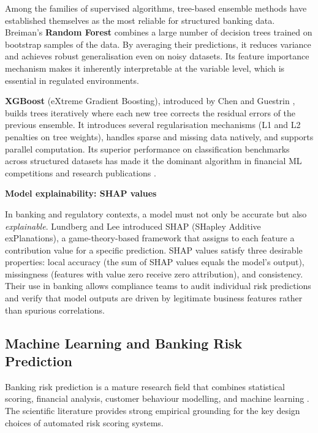 Among the families of supervised algorithms, tree-based ensemble methods have established
themselves as the most reliable for structured banking data. Breiman's \textbf{Random
Forest} \cite{breiman2001} combines a large number of decision trees trained on bootstrap
samples of the data. By averaging their predictions, it reduces variance and achieves robust
generalisation even on noisy datasets. Its feature importance mechanism makes it inherently
interpretable at the variable level, which is essential in regulated environments.

\textbf{XGBoost} (eXtreme Gradient Boosting), introduced by Chen and Guestrin
\cite{chen2016}, builds trees iteratively where each new tree corrects the residual errors
of the previous ensemble. It introduces several regularisation mechanisms (L1 and L2
penalties on tree weights), handles sparse and missing data natively, and supports parallel
computation. Its superior performance on classification benchmarks across structured datasets
has made it the dominant algorithm in financial ML competitions and research publications
\cite{lessmann2015}.

\textbf{Model explainability: SHAP values}

In banking and regulatory contexts, a model must not only be accurate but also
\textit{explainable}. Lundberg and Lee \cite{lundberg2017} introduced SHAP (SHapley
Additive exPlanations), a game-theory-based framework that assigns to each feature a
contribution value for a specific prediction. SHAP values satisfy three desirable
properties: local accuracy (the sum of SHAP values equals the model's output),
missingness (features with value zero receive zero attribution), and consistency.
Their use in banking allows compliance teams to audit individual risk predictions and
verify that model outputs are driven by legitimate business features rather than
spurious correlations.

\subsection{Machine Learning and Banking Risk Prediction}

Banking risk prediction is a mature research field that combines statistical scoring,
financial analysis, customer behaviour modelling, and machine learning
\cite{hand1997, bravo2013}. The scientific literature provides strong empirical grounding
for the key design choices of automated risk scoring systems.


